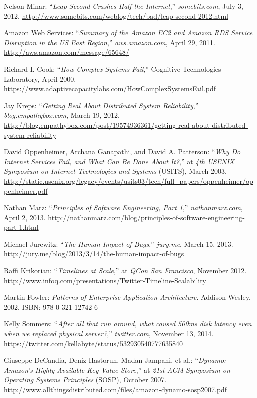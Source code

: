 \begin{thebibliography}{99}
   Nelson Minar: ``\textit{Leap Second Crashes Half the Internet},'' \textit{somebits.com}, July 3, 2012. \url{http://www.somebits.com/weblog/tech/bad/leap-second-2012.html}

   Amazon Web Services: ``\textit{Summary of the Amazon EC2 and Amazon RDS Service Disruption in the US East Region},'' \textit{aws.amazon.com}, April 29, 2011. \url{http://aws.amazon.com/message/65648/}

   Richard I. Cook: ``\textit{How Complex Systems Fail},'' Cognitive Technologies Laboratory, April 2000. \url{https://www.adaptivecapacitylabs.com/HowComplexSystemsFail.pdf}

   Jay Kreps: ``\textit{Getting Real About Distributed System Reliability},'' \textit{blog.empathybox.com}, March 19, 2012. \url{http://blog.empathybox.com/post/19574936361/getting-real-about-distributed-system-reliability}

   David Oppenheimer, Archana Ganapathi, and David A. Patterson: ``\textit{Why Do Internet Services Fail, and What Can Be Done About It?},'' at \textit{4th USENIX Symposium on Internet Technologies and Systems} (USITS), March 2003. \url{http://static.usenix.org/legacy/events/usits03/tech/full_papers/oppenheimer/oppenheimer.pdf}

   Nathan Marz: ``\textit{Principles of Software Engineering, Part 1},'' \textit{nathanmarz.com}, April 2, 2013. \url{http://nathanmarz.com/blog/principles-of-software-engineering-part-1.html}

   Michael Jurewitz: ``\textit{The Human Impact of Bugs},'' \textit{jury.me}, March 15, 2013. \url{http://jury.me/blog/2013/3/14/the-human-impact-of-bugs}

   Raffi Krikorian: ``\textit{Timelines at Scale},'' at \textit{QCon San Francisco}, November 2012. \url{http://www.infoq.com/presentations/Twitter-Timeline-Scalability}

   Martin Fowler: \textit{Patterns of Enterprise Application Architecture}. Addison Wesley, 2002. ISBN: 978-0-321-12742-6

   Kelly Sommers: ``\textit{After all that run around, what caused 500ms disk latency even when we replaced physical server?},'' \textit{twitter.com}, November 13, 2014. \url{https://twitter.com/kellabyte/status/532930540777635840}

   Giuseppe DeCandia, Deniz Hastorun, Madan Jampani, et al.: ``\textit{Dynamo: Amazon's Highly Available Key-Value Store},'' at \textit{21st ACM Symposium on Operating Systems Principles} (SOSP), October 2007. \url{http://www.allthingsdistributed.com/files/amazon-dynamo-sosp2007.pdf}


\end{thebibliography}

